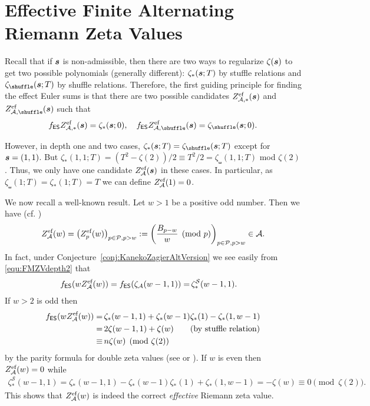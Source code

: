 \documentclass{article}
\newcommand{\ES}{\mathsf {ES}}
\newcommand{\sha}{\shuffle}
\newcommand{\Sy}{{\mathcal S}}
\newcommand{\bfs}{{\boldsymbol{\sl{s}}}}
\newcommand{\calA}{\mathcal{A}}
\newcommand{\calP}{\mathcal{P}}
\newcommand{\eff}{\text{\rm{ef}}}
\theoremstyle{plain}
\theoremstyle{definition}
\begin{document}
\section{Effective Finite Alternating Riemann Zeta Values}\label{sec:depthOne}
Recall that if $\bfs$ is non-admissible, then there are two ways to regularize $\zeta(\bfs)$ to get two possible polynomials (generally different): $\zeta_*(\bfs;T)$ by stuffle relations and $\zeta_\sha(\bfs;T)$ by shuffle relations. Therefore, the first guiding principle for finding the effect Euler sums is that there are two possible candidates $Z_{\calA,*}^\eff(\bfs)$ and $Z_{\calA,\sha}^\eff(\bfs)$ such that
\begin{equation*}
     f_\ES Z_{\calA,*}^\eff(\bfs)=\zeta_*(\bfs;0),\quad   f_\ES Z_{\calA,\sha}^\eff(\bfs)=\zeta_\sha(\bfs;0).
\end{equation*}

However, in depth one and two cases, $\zeta_*(\bfs;T)=\zeta_\sha(\bfs;T)$ except for $\bfs=(1,1)$.
But $\zeta_*(1,1;T)=(T^2-\zeta(2))/2\equiv T^2/2=\zeta_\sha(1,1;T)$ mod $\zeta(2)$. Thus, we only have one candidate $Z_\calA^\eff(\bfs)$ in these cases. In particular, as $\zeta_\sha(1;T)=\zeta_*(1;T)=T$ we can define $Z_\calA^\eff(1)=0$.

We now recall a well-known result.  Let $w>1$ be a positive odd number. Then we have (cf. \cite{KanekoZa2026})
\begin{equation}\label{equ:effRiemann}
    Z_\calA^\eff(w)=\big(Z_p^\eff(w)\big)_{p\in\calP,p>w}:=\left(  \frac{B_{p-w}}{w} \pmod{p} \right)_{p\in\calP,p>w}\in \calA.
\end{equation}
In fact, under Conjecture~\ref{conj:KanekoZagierAltVersion} we see easily from \eqref{equ:FMZVdepth2} that
\begin{align*}
    f_\ES( w Z_\calA^\eff(w))= f_\ES( \zeta_\calA(w-1,1) )= &\,\zeta_\ast^\Sy(w-1,1).
\end{align*}
If $w>2$ is odd then
\begin{align*}
    f_\ES( w Z_\calA^\eff(w))=&\, \zeta_\ast(w-1,1)+\zeta_\ast(w-1)\zeta_\ast(1)-\zeta_\ast(1,w-1) \\
    =&\,2\zeta(w-1,1) +\zeta(w)   \qquad \text{(by stuffle relation)}\\
    \equiv&\, n\zeta(w) \pmod{\zeta(2)}
\end{align*}
by the parity formula for double zeta values (see \cite[(75)]{BorweinBrBr1997} or \cite[Cor.~4.2]{XuZhao2023Oct}).
If $w$ is even then $Z_\calA^\eff(w)=0$ while
\begin{align*}
   \zeta_\ast^\Sy(w-1,1)=\zeta_\ast(w-1,1)-\zeta_\ast(w-1)\zeta_\ast(1)+\zeta_\ast(1,w-1)
   = -\zeta(w) \equiv 0 \pmod{\zeta(2)}.
\end{align*}
This shows that $Z_\calA^\eff(w)$ is indeed the correct \emph{effective} Riemann zeta value.
\end{document}
